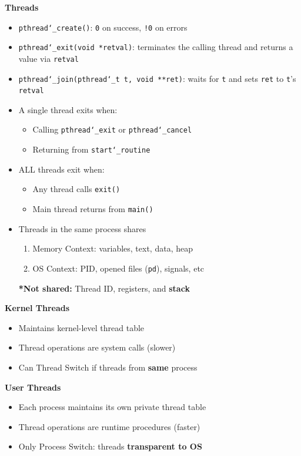 \documentclass[a4paper, 12pt]{article}
\begin{document}
\begin{multicols*}{4}
\medskip

{\small\textbf{Threads}}
\begin{itemize}
    \item \texttt{pthread\char`_create()}: \texttt{0} on success, \texttt{!0} on errors
	\item \texttt{pthread\char`_exit(void *retval)}: terminates the calling thread and returns a value via \texttt{retval}
	\item \texttt{pthread\char`_join(pthread\char`_t t, void **ret)}: waits for \texttt{t} and sets \texttt{ret} to \texttt{t}'s \texttt{retval}
	\item A single thread exits when:
	\begin{itemize}
		\item Calling \texttt{pthread\char`_exit} or \texttt{pthread\char`_cancel}
		\item Returning from \texttt{start\char`_routine}
	\end{itemize}
	\item ALL threads exit when:
	\begin{itemize}
		\item Any thread calls \texttt{exit()} 
		\item Main thread returns from \texttt{main()}
	\end{itemize}
	\item Threads in the same process shares
	\begin{enumerate}
		\item Memory Context: variables, text, data, heap
		\item OS Context: PID, opened files (\texttt{pd}), signals, etc
	\end{enumerate}
	\textbf{*Not shared:} Thread ID, registers, and \textbf{stack}
\end{itemize}
\textbf{Kernel Threads}
\begin{itemize}
	\item Maintains kernel-level thread table
	\item Thread operations are system calls (slower)
	\item Can Thread Switch if threads from \textbf{same} process
\end{itemize}
\textbf{User Threads}
\begin{itemize}
	\item Each process maintains its own private thread table
	\item Thread operations are runtime procedures (faster)
	\item Only Process Switch: threads \textbf{transparent to OS}

\end{itemize}
\end{multicols*}
\end{document}
